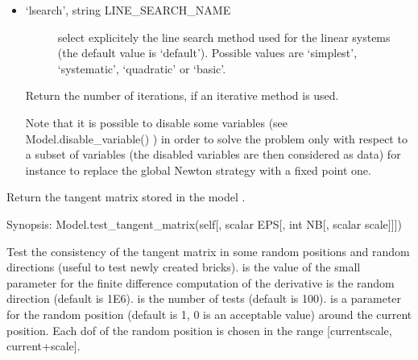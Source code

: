 \documentclass[a4paper,11pt,english]{sphinxmanual}
\begin{document}
\begin{fulllineitems}
\begin{fulllineitems}
\begin{itemize}
\begin{description}
\end{description}

\item {} \begin{description}
\item[{‘lsearch’, string LINE\_SEARCH\_NAME}] \leavevmode
select explicitely the line search method used for the linear systems (the
default value is ‘default’).
Possible values are ‘simplest’, ‘systematic’, ‘quadratic’ or ‘basic’.

\end{description}

Return the number of iterations, if an iterative method is used.

Note that it is possible to disable some variables
(see Model.disable\_variable() ) in order to
solve the problem only with respect to a subset of variables (the
disabled variables are then considered as data) for instance to
replace the global Newton strategy with a fixed point one.

\end{itemize}

\end{fulllineitems}


\begin{fulllineitems}
\label{\detokenize{python/cmdref_Model:getfem.Model.tangent_matrix}}
Return the tangent matrix stored in the model .

\end{fulllineitems}


\begin{fulllineitems}
\label{\detokenize{python/cmdref_Model:getfem.Model.test_tangent_matrix}}
Synopsis: Model.test\_tangent\_matrix(self{[}, scalar EPS{[}, int NB{[}, scalar scale{]}{]}{]})

Test the consistency of the tangent matrix in some random positions
and random directions (useful to test newly created bricks).
 is the value of the small parameter for the finite difference
computation of the derivative is the random direction (default is 1E\sphinxhyphen{}6).
 is the number of tests (default is 100).  is a parameter
for the random position (default is 1, 0 is an acceptable value) around
the current position.
Each dof of the random position is chosen in the range
{[}current\sphinxhyphen{}scale, current+scale{]}.


\end{fulllineitems}
\end{fulllineitems}
\end{document}
